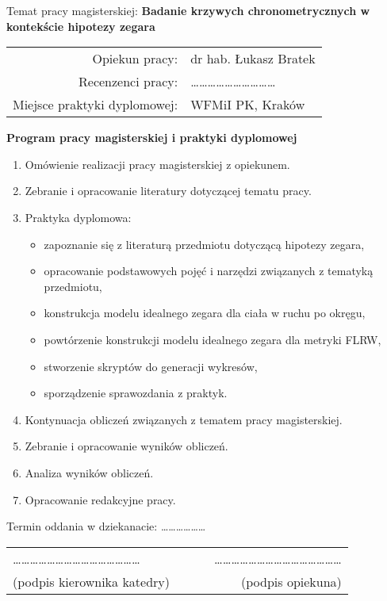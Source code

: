 {Temat pracy magisterskiej:
{\bf Badanie krzywych chronometrycznych w kontekście hipotezy zegara}\\

\begin{tabular}{rl}

Opiekun pracy:                  & dr hab. Łukasz Bratek\\
Recenzenci pracy:               & \dots \dots \dots \dots \dots \dots \dots \dots \dots \dots\\ 
Miejsce praktyki dyplomowej:    & WFMiI PK, Kraków\\
\end{tabular}

\begin{center}
{\bf Program pracy magisterskiej i praktyki dyplomowej}
\end{center}

\begin{enumerate}
\item Omówienie realizacji pracy magisterskiej z opiekunem.
\item Zebranie i opracowanie literatury dotyczącej tematu pracy.
\item Praktyka dyplomowa:
\begin{itemize}
\item zapoznanie się z literaturą przedmiotu dotyczącą hipotezy zegara,
\item opracowanie podstawowych pojęć i narzędzi związanych z tematyką przedmiotu,
\item konstrukcja modelu idealnego zegara dla ciała w ruchu po okręgu,
\item powtórzenie konstrukcji modelu idealnego zegara dla metryki FLRW,
\item stworzenie skryptów do generacji wykresów,
\item sporządzenie sprawozdania z praktyk.
\end{itemize}
\item Kontynuacja obliczeń związanych z tematem pracy magisterskiej.
\item Zebranie i opracowanie wyników obliczeń.
\item Analiza wyników obliczeń.
\item Opracowanie redakcyjne pracy.
\end{enumerate}


\noindent
Termin oddania w dziekanacie: \dots \dots \dots \dots \dots \dots\\[1cm]

\begin{center}
\begin{tabular}{lcr}
\dots\dots\dots\dots\dots\dots\dots\dots\dots\dots\dots\dots\dots\dots\dots & ~~~ &
\dots\dots\dots\dots\dots\dots\dots\dots\dots\dots\dots\dots\dots\dots\dots \\
(podpis kierownika katedry) & & (podpis opiekuna) \\
\end{tabular}
\end{center}

}
